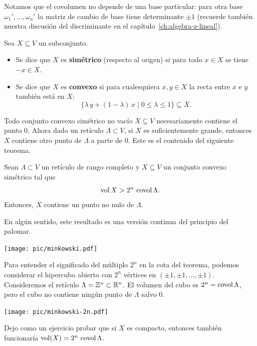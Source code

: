 Notamos que el covolumen no depende de una base particular: para otra base
$\omega_1', \ldots, \omega_n'$ la matriz de cambio de base tiene determinante
$\pm 1$ (recuerde también nuestra discusión del discriminante en el
capítulo~\ref{ch:algebra-z-lineal}).

\begin{definicion}
  Sea $X \subseteq V$ un subconjunto.

  \begin{itemize}
  \item Se dice que $X$ es \textbf{simétrico} (respecto al origen) si para todo
    $x \in X$ se tiene $-x \in X$.

  \item Se dice que $X$ es \textbf{convexo} si para cualesquiera $x,y\in X$ la
    recta entre $x$ e $y$ también está en $X$:
    $$\{ \lambda\,y + (1-\lambda)\,x \mid 0 \le \lambda \le 1 \} \subseteq X.$$
  \end{itemize}
\end{definicion}

Todo conjunto convexo simétrico no vacío $X \subseteq V$ necesariamente contiene
el punto $0$. Ahora dado un retículo $\Lambda \subset V$, si $X$ es
suficientemente grande, entonces $X$ contiene otro punto de $\Lambda$ a parte de
$0$. Este es el contenido del siguiente teorema.

\begin{teorema}
  Sean $\Lambda \subset V$ un retículo de rango completo y $X \subseteq V$
  un conjunto convexo simétrico tal que
  $$\operatorname{vol} X > 2^n\,\operatorname{covol} \Lambda.$$
  Entonces, $X$ contiene un punto no nulo de $\Lambda$.
\end{teorema}

En algún sentido, este resultado es una versión continua del principio
del palomar.

\begin{center}
  \texttt{[image: pic/minkowski.pdf]}
\end{center}

\begin{comentario}
  Para entender el significado del múltiplo $2^n$ en la cota del teorema,
  podemos considerar el hipercubo abierto con $2^n$ vértices en
  $(\pm 1, \pm 1, \ldots, \pm 1)$. Consideremos el retículo
  $\Lambda = \mathbb{Z}^n \subset \mathbb{R}^n$. El volumen del cubo es
  $2^n = \operatorname{covol} \Lambda$, pero el cubo no contiene ningún punto de $\Lambda$
  salvo $0$.

  \begin{center}
    \texttt{[image: pic/minkowski-2n.pdf]}
  \end{center}

  Dejo como un ejercicio probar que si $X$ es compacto, entonces también
  funcionaría $\operatorname{vol} (X) = 2^n \, \operatorname{covol} \Lambda$.
\end{comentario}

